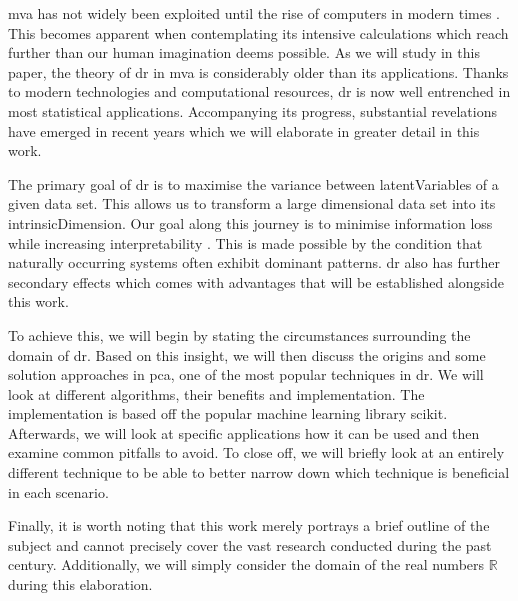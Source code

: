 \Gls{mva} has not widely been exploited until the rise of computers in modern times \cite{Jolliffe2002book}.
This becomes apparent when contemplating its intensive calculations which reach further than our human imagination deems possible.
As we will study in this paper, the theory of \gls{dr} in \gls{mva} is considerably older than its applications.
Thanks to modern technologies and computational resources, \gls{dr} is now well entrenched in most statistical applications.
Accompanying its progress, substantial revelations have emerged in recent years which we will elaborate in greater detail in this work.
\bigskip


The primary goal of \gls{dr} is to maximise the variance between \glspl{latentVariable} of a given data set.
This allows us to transform a large dimensional data set into its \gls{intrinsicDimension}.
Our goal along this journey is to minimise information loss while increasing interpretability \cite{jolliffe2016principal}.
This is made possible by the condition that naturally occurring systems often exhibit dominant patterns.
\Gls{dr} also has further secondary effects which comes with advantages that will be established alongside this work.
\medskip

To achieve this, we will begin by stating the circumstances surrounding the domain of \gls{dr}.
Based on this insight, we will then discuss the origins and some solution approaches in \gls{pca}, one of the most popular techniques in \gls{dr}.
We will look at different algorithms, their benefits and implementation.
The implementation is based off the popular machine learning library \gls{scikit}.
Afterwards, we will look at specific applications how it can be used and then examine common pitfalls to avoid.
To close off, we will briefly look at an entirely different technique to be able to better narrow down which technique is beneficial in each scenario.
\bigskip


Finally, it is worth noting that this work merely portrays a brief outline of the subject and cannot precisely cover the vast research conducted during the past century.
Additionally, we will simply consider the domain of the real numbers $\mathbb{R}$ during this elaboration.


